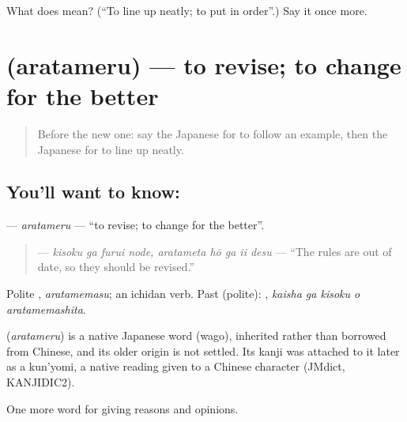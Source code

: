 \begin{tcolorbox}[breakable,colback=teal!4,colframe=teal!35!black,title={Before you move on}]
What does  mean? (\textquotedblleft{}To line up neatly; to put in order\textquotedblright{}.) Say it once more.
\end{tcolorbox}
\section[\texorpdfstring{\ja{あらためる} (aratameru)}{あらためる (aratameru)}]{ (aratameru) — to revise; to change for the better}

\label{lesson:JA-C330-aratameru}



\begin{quote}
Before the new one: say the Japanese for to follow an example, then the Japanese for to line up neatly.
\end{quote}

\subsection*{You'll want to know: }
\textbf{} — \emph{aratameru} — \textquotedblleft{}to revise; to change for the better\textquotedblright{}.

\begin{quote}
\textbf{   } — \emph{kisoku ga furui node, aratameta hō ga ii desu} — \textquotedblleft{}The rules are out of date, so they should be revised.\textquotedblright{}
\end{quote}

Polite \textbf{}, \emph{aratamemasu}; an ichidan verb. Past (polite): \textbf{  }, \emph{kaisha ga kisoku o aratamemashita}.

\begin{cousinweb}
\textbf{} (\emph{aratameru}) is a native Japanese word (wago), inherited rather than borrowed from Chinese, and its older origin is not settled. Its kanji was attached to it later as a kun'yomi, a native reading given to a Chinese character (JMdict, KANJIDIC2).
\end{cousinweb}

\begin{grammarlens}[title={What you've built}]
One more word for giving reasons and opinions.
\end{grammarlens}

